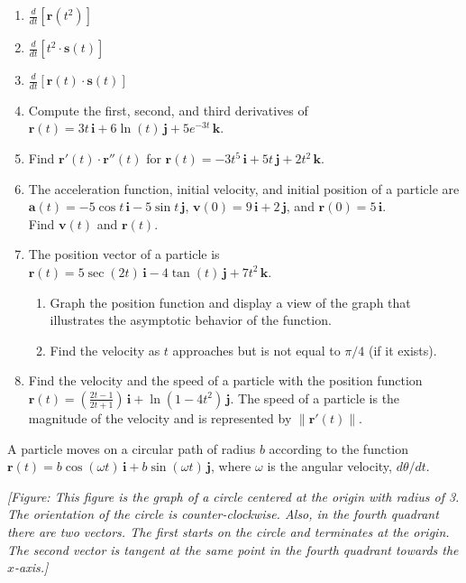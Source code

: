 \documentclass{exercises}
\begin{document}
\begin{enumerate}[resume]
\item $\frac{d}{dt}[\mathbf{r}(t^{2})]$
\item $\frac{d}{dt}[t^{2}\cdot \mathbf{s}(t)]$
\item $\frac{d}{dt}[\mathbf{r}(t)\cdot \mathbf{s}(t)]$
\item Compute the first, second, and third derivatives of $\mathbf{r}(t)=3t\,\mathbf{i}+6\ln(t)\,\mathbf{j}+5e^{-3t}\,\mathbf{k}$.
\item Find $\mathbf{r}'(t)\cdot \mathbf{r}''(t)$ for $\mathbf{r}(t)=-3t^{5}\,\mathbf{i}+5t\,\mathbf{j}+2t^{2}\,\mathbf{k}$.
\item The acceleration function, initial velocity, and initial position of a particle are\\ $\mathbf{a}(t)=-5\cos t\,\mathbf{i}-5\sin t\,\mathbf{j}$, $\mathbf{v}(0)=9\,\mathbf{i}+2\,\mathbf{j}$, and $\mathbf{r}(0)=5\,\mathbf{i}$.\\ Find $\mathbf{v}(t)$ and $\mathbf{r}(t)$.
\item The position vector of a particle is $\mathbf{r}(t)=5\sec(2t)\,\mathbf{i}-4\tan(t)\,\mathbf{j}+7t^{2}\,\mathbf{k}$.
\begin{enumerate}[label=(\alph*)]
  \item Graph the position function and display a view of the graph that illustrates the asymptotic behavior of the function.
  \item Find the velocity as $t$ approaches but is not equal to $\pi/4$ (if it exists).
\end{enumerate}
\item Find the velocity and the speed of a particle with the position function $\mathbf{r}(t)=(\frac{2t-1}{2t+1})\,\mathbf{i}+\ln(1-4t^{2})\,\mathbf{j}$. The speed of a particle is the magnitude of the velocity and is represented by $\|\mathbf{r}'(t)\|$.
\end{enumerate}

A particle moves on a circular path of radius $b$ according to the function $\mathbf{r}(t)=b\cos(\omega t)\,\mathbf{i}+b\sin(\omega t)\,\mathbf{j}$, where $\omega$ is the angular velocity, $d\theta/dt$.


\textit{[Figure: This figure is the graph of a circle centered at the origin with radius of 3. The orientation of the circle is counter-clockwise. Also, in the fourth quadrant there are two vectors. The first starts on the circle and terminates at the origin. The second vector is tangent at the same point in the fourth quadrant towards the $x$-axis.]}
\end{document}
